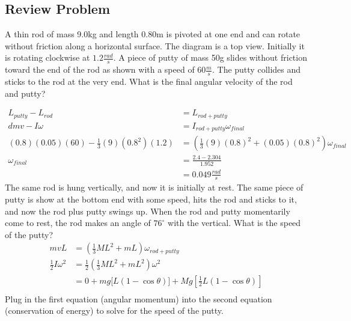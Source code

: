 \documentclass{math}
\begin{document}
\subsection*{Review Problem}
A thin rod of mass 9.0kg and length 0.80m is pivoted at one end and can
rotate without friction along a horizontal surface. The diagram is a top view.
Initially it is rotating clockwise at \( 1.2\frac{rad}{s} \). A piece of putty
of mass 50g slides without friction toward the end of the rod as shown with
a speed of \( 60\frac{m}{s} \). The putty collides and sticks to the rod at
the very end. What is the final angular velocity of the rod and putty?
\begin{center}
\end{center}
\begin{align*}
  L_{putty}-L_{rod} &= L_{rod+putty} \\
  dmv-I\omega &= I_{rod+putty}\omega_{final} \\
  (0.8)(0.05)(60)-\frac{1}{3}(9)(0.8^2)(1.2) &=
    (\frac{1}{3}(9)(0.8)^2+(0.05)(0.8)^2)\omega_{final} \\
  \omega_{final} &= \frac{2.4-2.304}{1.952} \\
  &= 0.049\frac{rad}{s}
\end{align*}
The same rod is hung vertically, and now it is initially at rest. The same
piece of putty is show at the bottom end with some speed, hits the rod and
sticks to it, and now the rod plus putty swings up. When the rod and putty
momentarily come to rest, the rod makes an angle of \( 76^{\circ} \) with the
vertical. What is the speed of the putty?
\begin{align*}
  mvL &= \left(\frac{1}{3}ML^2+mL\right)\omega_{rod+putty} \\
  \frac{1}{2}I\omega^2 &=
    \frac{1}{2}\left(\frac{1}{3}ML^2+mL^2\right)\omega^2 \\
  &= 0+mg\bigg[L(1-\cos\theta)\bigg]+
    Mg\left[\frac{1}{2}L(1-\cos\theta)\right] \\
\end{align*}
Plug in the first equation (angular momentum) into the second equation
(conservation of energy) to solve for the speed of the putty.
\end{document}
